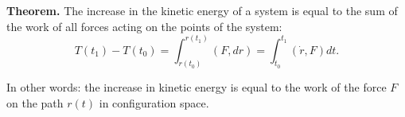 \textbf{Theorem.} The increase in the kinetic energy of a system is equal to the sum of the work of all forces acting on the points of the system:
$$T(t_1) - T(t_0) = \int_{r(t_0)}^{r(t_1)} (F, dr) = \int_{t_0}^{t_1} (\dot{r}, F) dt.$$

In other words: the increase in kinetic energy is equal to the work of the force $F$ on the path $r(t)$ in configuration space.

